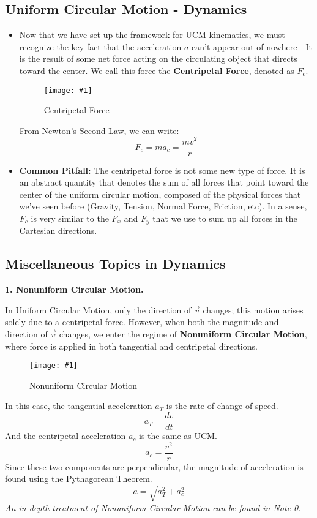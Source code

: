 \documentclass[11pt]{article}
\newcommand{\fig}[4]{
    \begin{figure}[H]
        \centering
        \texttt{[image: \#1]}
        \caption{#2}
        \label{exp4fit}
    \end{figure}
}
\theoremstyle{gangnamstyle}{\newtheorem{definition}{Definition}[]}
\theoremstyle{gangnamstyle}{\newtheorem{example}{Example}[]}
\theoremstyle{gangnamstyle}{\newtheorem{problem}{Problem}[]}
\begin{document}
\subsection{Uniform Circular Motion - Dynamics}

\begin{itemize}
\item Now that we have set up the framework for UCM kinematics, we must recognize the key fact that the acceleration $a$ can't appear out of nowhere---It is the result of some net force acting on the circulating object that directs toward the center. We call this force the \textbf{Centripetal Force}, denoted as $F_c$. 

\fig{figs/0702/ucm.png}{Centripetal Force}{0.65}{0}

From Newton's Second Law, we can write: 
\[ F_c = ma_c = \frac{mv^2}{r} \]

\item \textbf{Common Pitfall:} The centripetal force is not some new type of force. It is an abstract quantity that denotes the sum of all forces that point toward the center of the uniform circular motion, composed of the physical forces that we've seen before (Gravity, Tension, Normal Force, Friction, etc). In a sense, $F_c$ is very similar to the $F_x$ and $F_y$ that we use to sum up all forces in the Cartesian directions. 
\end{itemize}

\pagebreak

\subsection{Miscellaneous Topics in Dynamics}

\textbf{1. Nonuniform Circular Motion.} 

In Uniform Circular Motion, only the direction of $\Vec{v}$ changes; this motion arises solely due to a centripetal force. However, when both the magnitude and direction of $\Vec{v}$ changes, we enter the regime of \textbf{Nonuniform Circular Motion}, where force is applied in both tangential and centripetal directions. 

\fig{figs/0702/nucm.png}{Nonuniform Circular Motion}{0.5}{0}

In this case, the tangential acceleration $a_T$ is the rate of change of speed. 
\[ a_T = \frac{dv}{dt} \]
And the centripetal acceleration $a_c$ is the same as UCM. 
\[ a_c = \frac{v^2}{r} \]
Since these two components are perpendicular, the magnitude of acceleration is found using the Pythagorean Theorem. 
\[ a = \sqrt{a_T^2 + a_c^2} \]
\textit{An in-depth treatment of Nonuniform Circular Motion can be found in Note 0. }
\end{document}
